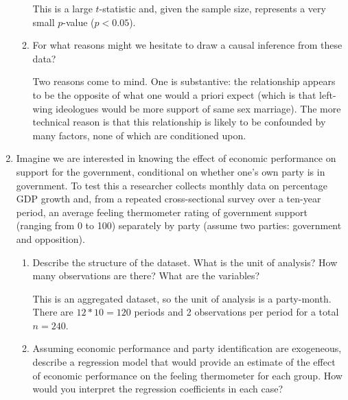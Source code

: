 \documentclass[a4paper]{exam}
\begin{document}
\begin{enumerate}
\begin{enumerate}
\begin{solution}
	This is a large $t$-statistic and, given the sample size, represents a very small $p$-value ($p<0.05$).
	
	\end{solution}
	
	\item For what reasons might we hesitate to draw a causal inference from these data?
	
	\begin{solution}
	
	Two reasons come to mind. One is substantive: the relationship appears to be the opposite of what one would a priori expect (which is that left-wing ideologues would be more support of same sex marriage). The more technical reason is that this relationship is likely to be confounded by many factors, none of which are conditioned upon.
	
	\end{solution}
	
	\end{enumerate}

\item Imagine we are interested in knowing the effect of economic performance on support for the government, conditional on whether one's own party is in government. To test this a researcher collects monthly data on percentage GDP growth and, from a repeated cross-sectional survey over a ten-year period, an average feeling thermometer rating of government support (ranging from 0 to 100) separately by party (assume two parties: government and opposition).

  \begin{enumerate}
  \item Describe the structure of the dataset. What is the unit of analysis? How many observations are there? What are the variables?
  
  \begin{solution}
  
  This is an aggregated dataset, so the unit of analysis is a party-month. There are $12*10 = 120$ periods and 2 observations per period for a total $n = 240$.
  
  \end{solution}
  
  \item Assuming economic performance and party identification are exogeneous, describe a regression model that would provide an estimate of the effect of economic performance on the feeling thermometer for each group. How would you interpret the regression  coefficients in each case?
  

\end{enumerate}
\end{enumerate}
\end{document}

